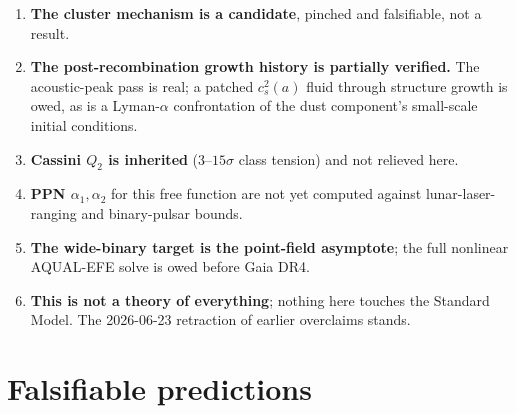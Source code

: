 \documentclass[aps,prd,twocolumn,10pt,nofootinbib,superscriptaddress]{revtex4-2}
\begin{document}
\begin{enumerate}
$\rho+3p$ vanishes when a fraction $f=1/3$ of the dust carries $w=-1$ --- plausibly a stable fixed
point, since the gate responds to local field strength. But lensing responds to $\rho+p$, still
$\tfrac23\rho$ there, giving $M_{\rm lens}/M_{\rm dyn}\approx29$ against an observed $1.0$--$1.3$.
Generally $\rho+3p=0$ requires $w=-\tfrac13$ and $\rho+p=0$ requires $w=-1$: incompatible. The only
configuration invisible to both is $\rho=0$, which (b) forbids reaching. \emph{The no-slip identity
$\Phi=\Psi$ underwriting Sec.~\ref{sec:lensing} is the same property that forbids hiding the dust.}
Accordingly the galaxy-interior problem is not a missing mechanism but a conservation law, a
transport bound and lensing: the repair space of local, energy-preserving modifications is empty,
and what remains is a structural change in which the $Q$-sector never acquires the galactic energy
--- against which the smooth-accretion result stands for any cold initial condition.
\item \textbf{The cluster mechanism is a candidate}, pinched and falsifiable, not a result.
\item \textbf{The post-recombination growth history is partially verified.} The acoustic-peak pass
is real; a patched $c_s^2(a)$ fluid through structure growth is owed, as is a Lyman-$\alpha$
confrontation of the dust component's small-scale initial conditions.
\item \textbf{Cassini $Q_2$ is inherited} ($3$--$15\sigma$ class tension) and not relieved here.
\item \textbf{PPN $\alpha_1,\alpha_2$} for this free function are not yet computed against
lunar-laser-ranging and binary-pulsar bounds.
\item \textbf{The wide-binary target is the point-field asymptote}; the full nonlinear AQUAL-EFE
solve is owed before Gaia DR4.
\item \textbf{This is not a theory of everything}; nothing here touches the Standard Model. The
2026-06-23 retraction of earlier overclaims stands.
\end{enumerate}

\section{Falsifiable predictions}
\label{sec:predictions}
\end{document}
